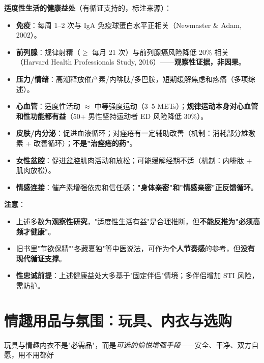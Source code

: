 \documentclass[12pt,UTF8,openany]{ctexbook}
\begin{document}
\textbf{适度性生活的健康益处}（有循证支持的，标注来源）：

\begin{itemize}[leftmargin=2em,itemsep=0.3em]
  \item \textbf{免疫}：每周 1--2 次与 IgA 免疫球蛋白水平正相关（Newmaster \& Adam, 2002）。
  \item \textbf{前列腺}：规律射精（$\geq$ 每月 21 次）与前列腺癌风险降低 20\% 相关（Harvard Health Professionals Study, 2016）——\textbf{观察性证据，非因果}。
  \item \textbf{压力/情绪}：高潮释放催产素/内啡肽/多巴胺，短期缓解焦虑和疼痛（多项综述）。
  \item \textbf{心血管}：适度性活动 $\approx$ 中等强度运动（3--5 METs）；\textbf{规律运动本身对心血管和性功能都有益}（50+ 男性坚持运动者 ED 风险降低 30\%）。
  \item \textbf{皮肤/内分泌}：促进血液循环；对痤疮有一定辅助改善（机制：消耗部分雄激素 + 改善循环）；\textbf{不是"治痤疮的药"}。
  \item \textbf{女性盆腔}：促进盆腔肌肉活动和放松；可能缓解经期不适（机制：内啡肽 + 肌肉放松）。
  \item \textbf{情感连接}：催产素增强依恋和信任感；\textbf{"身体亲密"和"情感亲密"正反馈循环}。
\end{itemize}

\noindent\textbf{注意}：
\begin{itemize}[leftmargin=2em,itemsep=0.2em]
  \item 上述多数为\textbf{观察性研究}，"适度性生活有益"是合理推断，但\textbf{不能反推为"必须高频才健康"}。
  \item 旧书里"节欲保精""冬藏夏独"等中医说法，可作为\textbf{个人节奏感}的参考，但\textbf{没有现代循证支撑}。
  \item \textbf{性忠诚前提}：上述健康益处大多基于"固定伴侣"情境；多伴侣增加 STI 风险，需防护。
\end{itemize}

\chapter{情趣用品与氛围：玩具、内衣与选购}

\begin{center}
\myhei\large 玩具与情趣内衣不是"必需品"，而是\emph{可选的愉悦增强手段}——安全、干净、双方自愿，用不用都好
\end{center}
\end{document}
